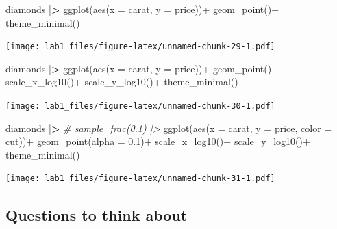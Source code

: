 \documentclass[
]{article}
\newenvironment{Shaded}{\begin{snugshade}}{\end{snugshade}}
\newcommand{\AttributeTok}[1]{\textcolor[rgb]{0.77,0.63,0.00}{#1}}
\newcommand{\CommentTok}[1]{\textcolor[rgb]{0.56,0.35,0.01}{\textit{#1}}}
\newcommand{\ErrorTok}[1]{\textcolor[rgb]{0.64,0.00,0.00}{\textbf{#1}}}
\newcommand{\FloatTok}[1]{\textcolor[rgb]{0.00,0.00,0.81}{#1}}
\newcommand{\FunctionTok}[1]{\textcolor[rgb]{0.00,0.00,0.00}{#1}}
\newcommand{\NormalTok}[1]{#1}
\newcommand{\SpecialCharTok}[1]{\textcolor[rgb]{0.00,0.00,0.00}{#1}}
\begin{document}
\begin{Shaded}
\begin{Highlighting}[]
\NormalTok{diamonds }\SpecialCharTok{|}\ErrorTok{\textgreater{}} 
  \FunctionTok{ggplot}\NormalTok{(}\FunctionTok{aes}\NormalTok{(}\AttributeTok{x =}\NormalTok{ carat, }\AttributeTok{y =}\NormalTok{ price))}\SpecialCharTok{+}
  \FunctionTok{geom\_point}\NormalTok{()}\SpecialCharTok{+}
  \FunctionTok{theme\_minimal}\NormalTok{()}
\end{Highlighting}
\end{Shaded}

\texttt{[image: lab1\_files/figure-latex/unnamed-chunk-29-1.pdf]}

\begin{Shaded}
\begin{Highlighting}[]
\NormalTok{diamonds }\SpecialCharTok{|}\ErrorTok{\textgreater{}} 
  \FunctionTok{ggplot}\NormalTok{(}\FunctionTok{aes}\NormalTok{(}\AttributeTok{x =}\NormalTok{ carat, }\AttributeTok{y =}\NormalTok{ price))}\SpecialCharTok{+}
  \FunctionTok{geom\_point}\NormalTok{()}\SpecialCharTok{+}
  \FunctionTok{scale\_x\_log10}\NormalTok{()}\SpecialCharTok{+}
  \FunctionTok{scale\_y\_log10}\NormalTok{()}\SpecialCharTok{+}
  \FunctionTok{theme\_minimal}\NormalTok{()}
\end{Highlighting}
\end{Shaded}

\texttt{[image: lab1\_files/figure-latex/unnamed-chunk-30-1.pdf]}

\begin{Shaded}
\begin{Highlighting}[]
\NormalTok{diamonds }\SpecialCharTok{|}\ErrorTok{\textgreater{}} 
  \CommentTok{\# sample\_frac(0.1) |\textgreater{} }
  \FunctionTok{ggplot}\NormalTok{(}\FunctionTok{aes}\NormalTok{(}\AttributeTok{x =}\NormalTok{ carat, }\AttributeTok{y =}\NormalTok{ price, }\AttributeTok{color =}\NormalTok{ cut))}\SpecialCharTok{+}
  \FunctionTok{geom\_point}\NormalTok{(}\AttributeTok{alpha =} \FloatTok{0.1}\NormalTok{)}\SpecialCharTok{+}
  \FunctionTok{scale\_x\_log10}\NormalTok{()}\SpecialCharTok{+}
  \FunctionTok{scale\_y\_log10}\NormalTok{()}\SpecialCharTok{+}
  \FunctionTok{theme\_minimal}\NormalTok{()}
\end{Highlighting}
\end{Shaded}

\texttt{[image: lab1\_files/figure-latex/unnamed-chunk-31-1.pdf]}

\hypertarget{questions-to-think-about}{%
\subsection{Questions to think about}\label{questions-to-think-about}}
\end{document}
